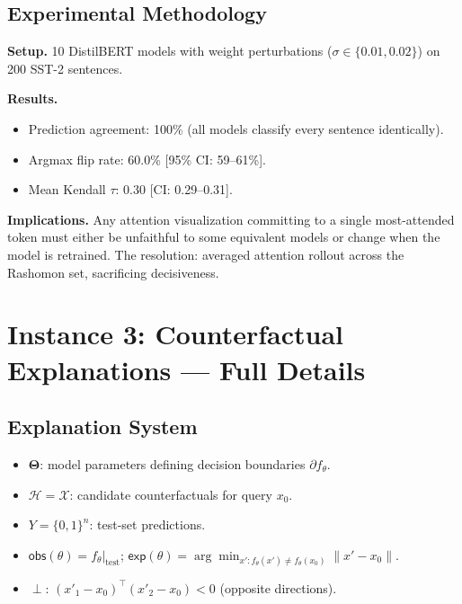 \documentclass{article}
\newcommand{\Params}{\mathbf{\Theta}}
\newcommand{\sH}{\mathcal{H}}
\newcommand{\incomp}{\perp}
\begin{document}
\subsection{Experimental Methodology}

\textbf{Setup.}  10 DistilBERT models with weight perturbations ($\sigma \in \{0.01, 0.02\}$) on 200 SST-2 sentences.

\textbf{Results.}
\begin{itemize}
  \item Prediction agreement: 100\% (all models classify every sentence identically).
  \item Argmax flip rate: 60.0\% [95\% CI: 59--61\%].
  \item Mean Kendall $\tau$: 0.30 [CI: 0.29--0.31].
\end{itemize}

\textbf{Implications.}  Any attention visualization committing to a single most-attended token must either be unfaithful to some equivalent models or change when the model is retrained.  The resolution: averaged attention rollout across the Rashomon set, sacrificing decisiveness.

\section{Instance 3: Counterfactual Explanations --- Full Details}
\label{sec:cf-full}

\subsection{Explanation System}

\begin{itemize}
  \item $\Params$: model parameters defining decision boundaries $\partial f_\theta$.
  \item $\sH = \mathcal{X}$: candidate counterfactuals for query $x_0$.
  \item $Y = \{0,1\}^n$: test-set predictions.
  \item $\mathsf{obs}(\theta) = f_\theta|_{\text{test}}$; $\mathsf{exp}(\theta) = \arg\min_{x': f_\theta(x') \neq f_\theta(x_0)} \|x' - x_0\|$.
  \item $\incomp$: $(x'_1 - x_0)^\top(x'_2 - x_0) < 0$ (opposite directions).
\end{itemize}
\end{document}
